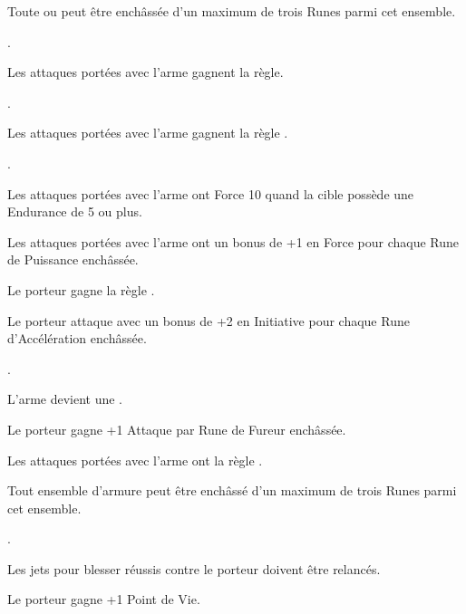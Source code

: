 \begin{multicols}{2}\raggedcolumns

\subtitle{Runes d'Arme}\vspace{5pt}

Toute \hw{} ou \pw{} peut être enchâssée d'un maximum de trois Runes parmi cet ensemble.

\startpricelist

\oneofakind{}.

Les attaques portées avec l'arme gagnent la règle.

\oneofakind{}.

Les attaques portées avec l'arme gagnent la règle .

\oneofakind{}.

Les attaques portées avec l'arme ont Force 10 quand la cible possède une Endurance de 5 ou plus.

Les attaques portées avec l'arme ont un bonus de +1 en Force pour chaque Rune de Puissance enchâssée.

Le porteur gagne la règle \lightningreflexes{}.

Le porteur attaque avec un bonus de +2 en Initiative pour chaque Rune d'Accélération enchâssée.

\oneofakind{}.

L'arme devient une \gw{}.

Le porteur gagne +1 Attaque par Rune de Fureur enchâssée.

Les attaques portées avec l'arme ont la règle \flamingattacks{}.

\endpricelist

\columnbreak
\subtitle{Runes d'Armure}\vspace{5pt}

Tout ensemble d'armure peut être enchâssé d'un maximum de trois Runes parmi cet ensemble.

\startpricelist

\oneofakind{}.

Les jets pour blesser réussis contre le porteur doivent être relancés.

Le porteur gagne +1 Point de Vie.


\end{multicols}
